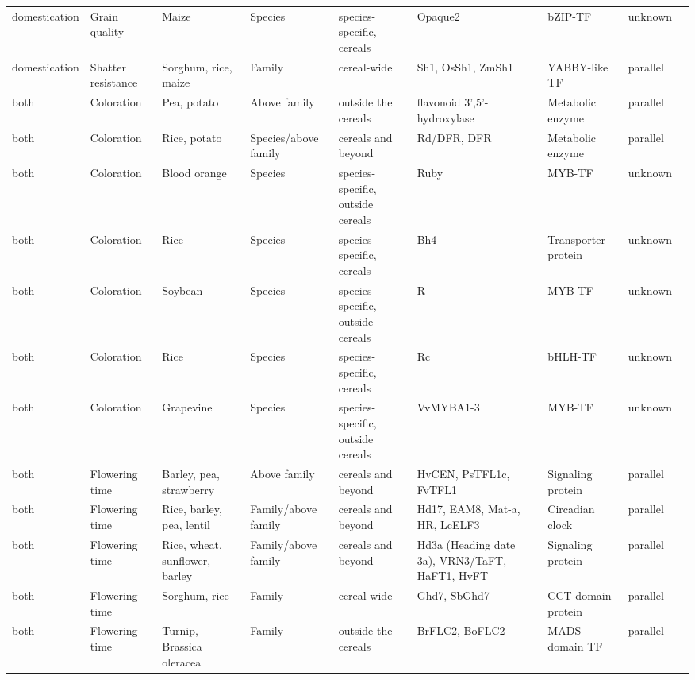 \documentclass[12pt]{article}
\begin{document}
\begin{table}
\begin{center}
\begin{tabular}{C{1.5cm}G{2.5cm}C{3.10cm}C{3.2cm}C{2.3cm}G{3.5cm}G{2.1cm}C{1.3cm}G{1.5cm}}
 domestication & Grain quality &Maize & Species & species-specific, cereals & Opaque2 & bZIP-TF & unknown & \citep{Martin2013}\\
 domestication & Shatter resistance &Sorghum, rice, maize & Family & cereal-wide & Sh1, OsSh1, ZmSh1 & YABBY-like TF & parallel & \citep{Lin2012}\\
 both & Coloration &Pea, potato & Above family & outside the cereals & flavonoid 3',5'-hydroxylase & Metabolic enzyme & parallel & \citep{Martin2013}\\
 both & Coloration &Rice, potato & Species/above family & cereals and beyond & Rd/DFR, DFR & Metabolic enzyme & parallel & \citep{Furukawa2006, Zhang2009}\\
 both & Coloration &Blood orange & Species & species-specific, outside cereals & Ruby & MYB-TF & unknown & \citep{Butelli2012}\\
 both & Coloration &Rice & Species & species-specific, cereals & Bh4 & Transporter protein & unknown & \citep{Zhu2011}\\
 both & Coloration &Soybean & Species & species-specific, outside cereals & R & MYB-TF & unknown & \citep{Gillman2011}\\
 both & Coloration &Rice & Species & species-specific, cereals & Rc & bHLH-TF & unknown & \citep{Martin2013}\\
 both & Coloration &Grapevine & Species & species-specific, outside cereals & VvMYBA1-3 & MYB-TF & unknown & \citep{Martin2013}\\
 both & Flowering time &Barley, pea, strawberry & Above family & cereals and beyond & HvCEN, PsTFL1c, FvTFL1 & Signaling protein & parallel & \citep{Comadran2012, Foucher2003, Koskela2012}\\
 both & Flowering time &Rice, barley, pea, lentil & Family/above family & cereals and beyond & Hd17, EAM8, Mat-a, HR, LcELF3 & Circadian clock& parallel & \citep{Weller2012, Matsubara2012, Zakhrabekova2012, Faure2012}\\
 both & Flowering time &Rice, wheat, sunflower, barley & Family/above family & cereals and beyond & Hd3a (Heading date 3a), VRN3/TaFT, HaFT1, HvFT & Signaling protein & parallel & \citep{Yan2006, Takahashi2009, Blackman2010}\\
 both & Flowering time &Sorghum, rice & Family & cereal-wide & Ghd7, SbGhd7 & CCT domain protein& parallel & \citep{Xue2008, Murphy2014}\\
 both & Flowering time &Turnip, Brassica oleracea & Family & outside the cereals & BrFLC2, BoFLC2 & MADS domain TF & parallel & \citep{Wu2012, Yuan2009, Okazaki2006}\\

\end{tabular}
\end{center}
\end{table}
\end{document}
